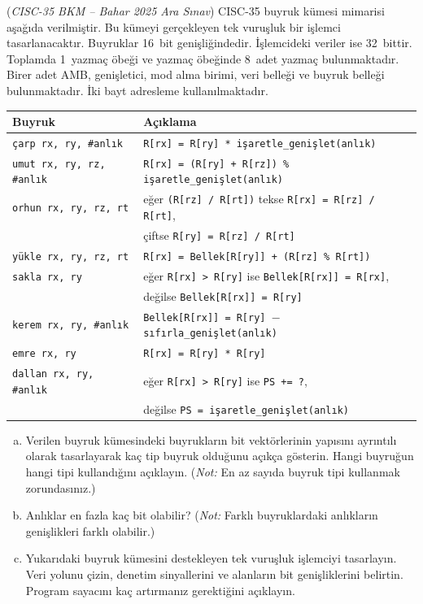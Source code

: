 \begin{alistirma}[\zor]
(\emph{CISC-35 BKM -- Bahar 2025 Ara Sınav})
CISC-35 buyruk kümesi mimarisi aşağıda verilmiştir. Bu kümeyi gerçekleyen tek vuruşluk bir işlemci tasarlanacaktır. Buyruklar 16~bit genişliğindedir. İşlemcideki veriler ise 32~bittir. Toplamda 1~yazmaç öbeği ve yazmaç öbeğinde 8~adet yazmaç bulunmaktadır. Birer adet AMB, genişletici, mod alma birimi, veri belleği ve buyruk belleği bulunmaktadır. İki bayt adresleme kullanılmaktadır.

\begin{center}
\small
\begin{tabular}{ll}
\toprule
\textbf{Buyruk} & \textbf{Açıklama} \\
\midrule
\texttt{çarp rx, ry, \#anlık} & \texttt{R[rx] = R[ry] * işaretle\_genişlet(anlık)} \\
\texttt{umut rx, ry, rz, \#anlık} & \texttt{R[rx] = (R[ry] + R[rz]) \% işaretle\_genişlet(anlık)} \\
\texttt{orhun rx, ry, rz, rt} & eğer \texttt{(R[rz] / R[rt])} tekse \texttt{R[rx] = R[rz] / R[rt]}, \\
 & çiftse \texttt{R[ry] = R[rz] / R[rt]} \\
\texttt{yükle rx, ry, rz, rt} & \texttt{R[rx] = Bellek[R[ry]] + (R[rz] \% R[rt])} \\
\texttt{sakla rx, ry} & eğer \texttt{R[rx] > R[ry]} ise \texttt{Bellek[R[rx]] = R[rx]}, \\
 & değilse \texttt{Bellek[R[rx]] = R[ry]} \\
\texttt{kerem rx, ry, \#anlık} & \texttt{Bellek[R[rx]] = R[ry] $-$ sıfırla\_genişlet(anlık)} \\
\texttt{emre rx, ry} & \texttt{R[rx] = R[ry] * R[ry]} \\
\texttt{dallan rx, ry, \#anlık} & eğer \texttt{R[rx] > R[ry]} ise \texttt{PS += ?}, \\
 & değilse \texttt{PS = işaretle\_genişlet(anlık)} \\
\bottomrule
\end{tabular}
\end{center}

\begin{enumerate}[(a)]
    \item Verilen buyruk kümesindeki buyrukların bit vektörlerinin yapısını ayrıntılı olarak tasarlayarak kaç tip buyruk olduğunu açıkça gösterin. Hangi buyruğun hangi tipi kullandığını açıklayın. (\emph{Not:} En az sayıda buyruk tipi kullanmak zorundasınız.)
    \item Anlıklar en fazla kaç bit olabilir? (\emph{Not:} Farklı buyruklardaki anlıkların genişlikleri farklı olabilir.)
    \item Yukarıdaki buyruk kümesini destekleyen tek vuruşluk işlemciyi tasarlayın. Veri yolunu çizin, denetim sinyallerini ve alanların bit genişliklerini belirtin. Program sayacını kaç artırmanız gerektiğini açıklayın.
\end{enumerate}
\end{alistirma}

